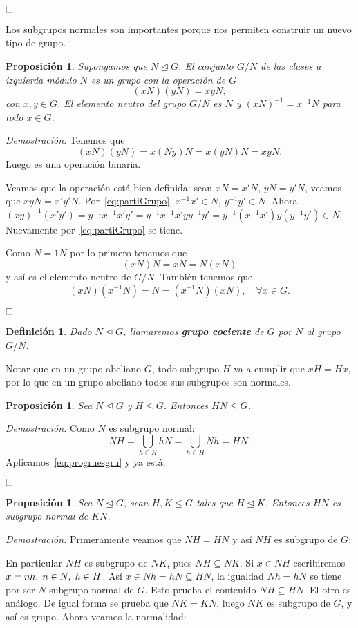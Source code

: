 \documentclass[12pt]{article}
\newtheorem{proposition}[theorem]{Proposición}
\newtheorem{definition}[theorem]{Definición}
\begin{document}
$\hfill \square$

Los subgrupos normales son importantes porque nos permiten construir un nuevo tipo de grupo.

\begin{proposition}\label{eq:cociente} Supongamos que $N \unlhd G$. El conjunto $G/N$ de las clases a izquierda módulo $N$ es un grupo con la operación de $G$ 
$$(xN)(yN)=xyN,$$ con $x,y \in G$. El elemento neutro del grupo $G/N$ es $N$ y $(xN)^{-1} = x^{-1}N$ para todo $x \in G$.
\end{proposition}
\emph{Demostración: }Tenemos que $$(xN)(yN)=x(Ny)N = x(yN)N = xyN.$$ Luego es una operación binaria. 

Veamos que la operación está bien definida: sean $xN = x'N$, $yN = y'N$, veamos que $xyN = x'y'N$. Por~\ref{eq:partiGrupo}, $x^{-1}x' \in N$, $y^{-1}y' \in N$. Ahora $(xy)^{-1}(x'y') = y^{-1}x^{-1}x'y' = y^{-1}x^{-1}x'yy^{-1}y'=y^{-1}(x^{-1}x')y(y^{-1}y') \in N$. Nuevamente por~\ref{eq:partiGrupo} se tiene.

Como $N = 1N$ por lo primero tenemos que $$(xN)N=xN = N(xN)$$ y así es el elemento neutro de $G/N$. También tenemos que $$(xN)(x^{-1}N) = N = (x^{-1}N)(xN),\quad \forall x\in G.$$

$\hfill \square$

\begin{definition}Dado $N \unlhd G$, llamaremos \textbf{grupo cociente} de $G$ por $N$ al grupo $G/N$.
\end{definition}

Notar que en un grupo abeliano $G$, todo subgrupo $H$ va a cumplir que $xH = Hx$, por lo que en un grupo abeliano todos sus subgrupos son normales.

\begin{proposition}Sea $N \unlhd G$ y $H \leq G$. Entonces $HN \leq G$.
\end{proposition}
\emph{Demostración: }Como $N$ es subgrupo normal: $$NH = \bigcup_{h\in H} hN = \bigcup_{h\in H} Nh = HN.$$ Aplicamos~\ref{eq:progruesgru} y ya está.

$\hfill \square$

\begin{proposition}\label{eq:ej218} Sea $N \unlhd G$, sean $H, K \leq G$ tales que $H \unlhd K$. Entonces $HN$ es subgrupo normal de $KN$.
\end{proposition}
\emph{Demostración: }Primeramente veamos que $NH=HN$ y así $NH$ es subgrupo de $G$:

En particular $NH$ es subgrupo de $NK$, pues $NH \subseteq NK$. Si $x \in NH$ escribiremos $x = nh, \hspace{0.1cm} n \in N, \hspace{0.1cm} h \in H$. Así $x \in Nh = hN \subseteq HN$, la igualdad $Nh = hN$ se tiene por ser $N$ subgrupo normal de $G$. Esto prueba el contenido $NH \subseteq HN$. El otro es análogo. De igual forma se prueba que $NK = KN$, luego $NK$ es subgrupo de $G$, y así es grupo. Ahora veamos la normalidad:
\end{document}
